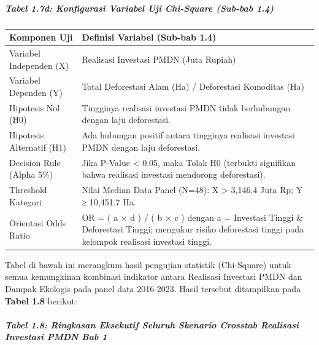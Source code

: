 \documentclass[
]{article}
\newcounter{none} %
\begin{document}
\subparagraph{Tabel 1.7d: Konfigurasi Variabel Uji Chi-Square (Sub-bab
1.4)}\label{tabel-1.7d-konfigurasi-variabel-uji-chi-square-sub-bab-1.4}

{\def\LTcaptype{none} %
\begin{longtable}[]{@{}
  >{\raggedright\arraybackslash}p{}
  >{\raggedright\arraybackslash}p{}@{}}
\toprule\noalign{}
\begin{minipage}[b]{\linewidth}\raggedright
Komponen Uji
\end{minipage} & \begin{minipage}[b]{\linewidth}\raggedright
Definisi Variabel (Sub-bab 1.4)
\end{minipage} \\
\midrule\noalign{}
\endhead
\bottomrule\noalign{}
\endlastfoot
Variabel Independen (X) & Realisasi Investasi PMDN (Juta Rupiah) \\
Variabel Dependen (Y) & Total Deforestasi Alam (Ha) / Deforestasi
Komoditas (Ha) \\
Hipotesis Nol (H0) & Tingginya realisasi investasi PMDN tidak
berhubungan dengan laju deforestasi. \\
Hipotesis Alternatif (H1) & Ada hubungan positif antara tingginya
realisasi investasi PMDN dengan laju deforestasi. \\
Decision Rule (Alpha 5\%) & Jika P-Value \textless{} 0.05, maka Tolak H0
(terbukti signifikan bahwa realisasi investasi mendorong
deforestasi). \\
Threshold Kategori & Nilai Median Data Panel (N=48): X \textgreater{}
3,146.4 Juta Rp; Y ≥ 10,451.7 Ha. \\
Orientasi Odds Ratio & OR = ( a × d ) / ( b × c ) dengan a = Investasi
Tinggi \& Deforestasi Tinggi; mengukur risiko deforestasi tinggi pada
kelompok realisasi investasi tinggi. \\
\end{longtable}
}

Tabel di bawah ini merangkum hasil pengujian statistik (Chi-Square)
untuk semua kemungkinan kombinasi indikator antara Realisasi Investasi
PMDN dan Dampak Ekologis pada panel data 2016-2023. Hasil tersebut
ditampilkan pada \textbf{Tabel 1.8} berikut:

\subparagraph{Tabel 1.8: Ringkasan Eksekutif Seluruh Skenario Crosstab
Realisasi Investasi PMDN Bab
1}\label{tabel-1.8-ringkasan-eksekutif-seluruh-skenario-crosstab-realisasi-investasi-pmdn-bab-1}
\end{document}
